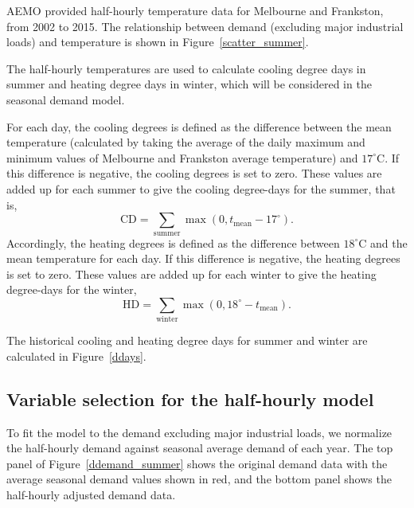 \documentclass[11pt]{article}
\begin{document}
AEMO provided half-hourly temperature data for Melbourne and Frankston, from 2002 to 2015. The relationship between demand (excluding major industrial loads) and temperature is shown in Figure~\ref{scatter_summer}.


The half-hourly temperatures are used to calculate cooling degree days in summer and heating degree days in winter, which will be considered in the seasonal demand model.

For each day, the cooling degrees is defined as the difference between the mean temperature (calculated by taking the average of the daily maximum and minimum values of Melbourne and Frankston average temperature) and $17^\circ$C. If this difference is negative, the cooling degrees is set to zero. These values are added up for each summer to give the cooling degree-days for the summer, that is,
\[
 \text{CD} = \sum\limits_{\text{summer}} \max(0, t_{\text{mean}} - 17^\circ).
\]
Accordingly, the heating degrees is defined as the difference between $18^\circ$C and the mean temperature for each day. If this difference is negative, the heating degrees is set to zero. These values are added up for each winter to give the heating degree-days for the winter,
\[
\text{HD} = \sum\limits_{\text{winter}} \max(0, 18^\circ - t_{\text{mean}}).
\]

The historical cooling and heating degree days for summer and winter are calculated in Figure~\ref{ddays}.



\subsection{Variable selection for the half-hourly model} \label{sec:variable selec}

To fit the model to the demand excluding major industrial loads, we normalize the half-hourly demand against seasonal average demand of each year. The top panel of Figure~\ref{ddemand_summer} shows the original demand data with the average seasonal demand values shown in red, and the bottom panel shows the half-hourly adjusted demand data.
\end{document}
